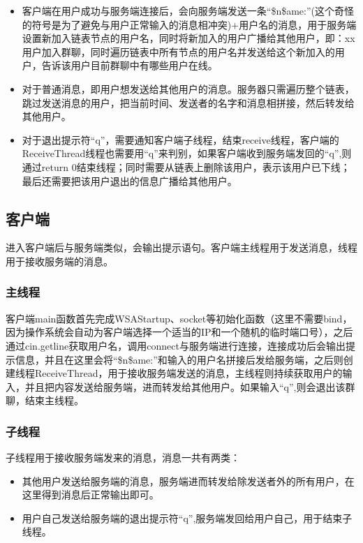 \documentclass[UTF8,a4paper,10pt]{ctexart}
\begin{document}
\begin{itemize}
\item 客户端在用户成功与服务端连接后，会向服务端发送一条“\$n\$ame:”(这个奇怪的符号是为了避免与用户正常输入的消息相冲突)$+$用户名的消息，用于服务端设置新加入链表节点的用户名，同时将新加入的用户广播给其他用户，即：xx用户加入群聊，同时遍历链表中所有节点的用户名并发送给这个新加入的用户，告诉该用户目前群聊中有哪些用户在线。
\item 对于普通消息，即用户想发送给其他用户的消息。服务器只需遍历整个链表，跳过发送消息的用户，把当前时间、发送者的名字和消息相拼接，然后转发给其他用户。
\item 对于退出提示符“q”，需要通知客户端子线程，结束receive线程，客户端的ReceiveThread线程也需要用“q”来判别，如果客户端收到服务端发回的“q”,则通过return 0结束线程；同时需要从链表上删除该用户，表示该用户已下线；最后还需要把该用户退出的信息广播给其他用户。
\end{itemize}

\subsection{客户端}
进入客户端后与服务端类似，会输出提示语句。客户端主线程用于发送消息，线程用于接收服务端的消息。

\subsubsection{主线程}
客户端main函数首先完成WSAStartup、socket等初始化函数（这里不需要bind，因为操作系统会自动为客户端选择一个适当的IP和一个随机的临时端口号），之后通过cin.getline获取用户名，调用connect与服务端进行连接，连接成功后会输出提示信息，并且在这里会将“\$n\$ame:”和输入的用户名拼接后发给服务端，之后则创建线程ReceiveThread，用于接收服务端发送的消息，主线程则持续获取用户的输入，并且把内容发送给服务端，进而转发给其他用户。如果输入“q”,则会退出该群聊，结束主线程。

\subsubsection{子线程}
子线程用于接收服务端发来的消息，消息一共有两类：

\begin{itemize}
\item 其他用户发送给服务端的消息，服务端进而转发给除发送者外的所有用户，在这里得到消息后正常输出即可。
\item 用户自己发送给服务端的退出提示符“q”,服务端发回给用户自己，用于结束子线程。
\end{itemize}
\end{document}
